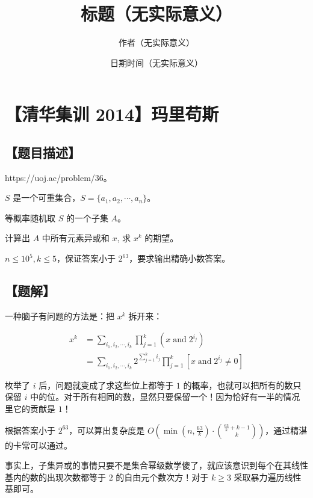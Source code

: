 \documentclass[UTF8,12pt,a4paper]{ctexart}
\title{标题（无实际意义）}
\author{作者（无实际意义）}
\date{日期时间（无实际意义）}
\begin{document}
	\fontsize{12pt}{12pt}\selectfont
	
	\newpage
	\pagestyle{fancy}
	
	
	
	\section*{【清华集训 2014】玛里苟斯}
	
	\subsection*{【题目描述】}
	
	https://uoj.ac/problem/36。
	
	$S$ 是一个可重集合，$S=\{a_1,a_2,\cdots,a_n\}$。
	
	等概率随机取 $S$ 的一个子集 $A$。
	
	计算出 $A$ 中所有元素异或和 $x$, 求 $x^k$ 的期望。
	
	$n\le 10^5,k\le 5$，保证答案小于 $2^63$，要求输出精确小数答案。
	
	\subsection*{【题解】}
	
	一种脑子有问题的方法是：把 $x^k$ 拆开来：
	
	$$
	\begin{aligned}
		x^k
		&= \sum_{i_1,i_2,\cdots, i_k} \prod_{j=1}^k \left(x \operatorname{and} 2^{i_j}\right)\\
		&= \sum_{i_1,i_2,\cdots, i_k} 2^{\sum_{j=1}^k i_j} \prod_{j=1}^k\left[x \operatorname{and} 2^{i_j} \neq 0\right]
	\end{aligned}
	$$
	
	枚举了 $i$ 后，问题就变成了求这些位上都等于 $1$ 的概率，也就可以把所有的数只保留 $i$ 中的位。对于所有相同的数，显然只要保留一个！因为恰好有一半的情况里它的贡献是 $1$！
	
	根据答案小于 $2^63$，可以算出复杂度是 $O\left(\min(n,\frac{63}k)\cdot\binom{\frac{63}{k}+k-1}{k}\right)$，通过精湛的卡常可以通过。
	
	事实上，子集异或的事情只要不是集合幂级数学傻了，就应该意识到每个在其线性基内的数的出现次数都等于 $2$ 的自由元个数次方！对于 $k\ge 3$ 采取暴力遍历线性基即可。
	
\end{document}
